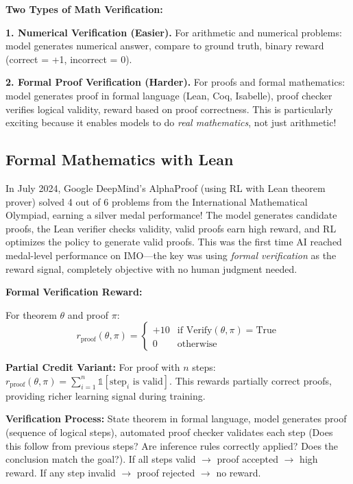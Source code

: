 \begin{chapterenv}
\textbf{Two Types of Math Verification:}

\textbf{1. Numerical Verification (Easier).} For arithmetic and numerical problems: model generates numerical answer, compare to ground truth, binary reward (correct = +1, incorrect = 0).

\textbf{2. Formal Proof Verification (Harder).} For proofs and formal mathematics: model generates proof in formal language (Lean, Coq, Isabelle), proof checker verifies logical validity, reward based on proof correctness. This is particularly exciting because it enables models to do \textit{real mathematics}, not just arithmetic!

\subsection{Formal Mathematics with Lean}

In July 2024, Google DeepMind's AlphaProof (using RL with Lean theorem prover) solved 4 out of 6 problems from the International Mathematical Olympiad, earning a silver medal performance! The model generates candidate proofs, the Lean verifier checks validity, valid proofs earn high reward, and RL optimizes the policy to generate valid proofs. This was the first time AI reached medal-level performance on IMO---the key was using \textit{formal verification} as the reward signal, completely objective with no human judgment needed.

\begin{infobox}
\textbf{Formal Verification Reward:}

For theorem $\theta$ and proof $\pi$:
$$r_{\text{proof}}(\theta, \pi) = \begin{cases} 
+10 & \text{if } \text{Verify}(\theta, \pi) = \text{True} \\
0 & \text{otherwise}
\end{cases}$$

\textbf{Partial Credit Variant:} For proof with $n$ steps: $r_{\text{proof}}(\theta, \pi) = \sum_{i=1}^n \mathbb{1}[\text{step}_i \text{ is valid}]$. This rewards partially correct proofs, providing richer learning signal during training.

\textbf{Verification Process:} State theorem in formal language, model generates proof (sequence of logical steps), automated proof checker validates each step (Does this follow from previous steps? Are inference rules correctly applied? Does the conclusion match the goal?). If all steps valid $\to$ proof accepted $\to$ high reward. If any step invalid $\to$ proof rejected $\to$ no reward.
\end{infobox}


\end{chapterenv}

